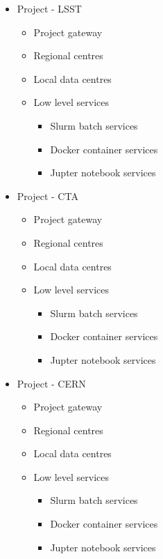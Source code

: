 \documentclass[11pt,a4paper]{ivoa}
\begin{document}
\begin{itemize}
    \item Project - LSST
    \begin{itemize}
        \item Project gateway
        \item Regional centres
        \item Local data centres
        \item Low level services
        \begin{itemize}
            \item Slurm batch services
            \item Docker container services
            \item Jupter notebook services
        \end{itemize}
    \end{itemize}
\end{itemize}

\begin{itemize}
    \item Project - CTA
    \begin{itemize}
        \item Project gateway
        \item Regional centres
        \item Local data centres
        \item Low level services
        \begin{itemize}
            \item Slurm batch services
            \item Docker container services
            \item Jupter notebook services
        \end{itemize}
    \end{itemize}
\end{itemize}

\begin{itemize}
    \item Project - CERN
    \begin{itemize}
        \item Project gateway
        \item Regional centres
        \item Local data centres
        \item Low level services
        \begin{itemize}
            \item Slurm batch services
            \item Docker container services
            \item Jupter notebook services
        \end{itemize}
    \end{itemize}
\end{itemize}
\end{document}
